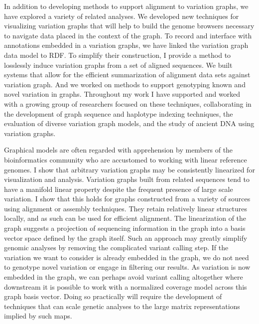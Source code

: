 In addition to developing methods to support alignment to variation graphs, we have explored a variety of related analyses.
We developed new techniques for visualizing variation graphs that will help to build the genome browsers necessary to navigate data placed in the context of the graph.
To record and interface with annotations embedded in a variation graphs, we have linked the variation graph data model to RDF.
To simplify their construction, I provide a method to losslessly induce variation graphs from a set of aligned sequences.
We built systems that allow for the efficient summarization of alignment data sets against variation graph.
And we worked on methods to support genotyping known and novel variation in graphs.
Throughout my work I have supported and worked with a growing group of researchers focused on these techniques, collaborating in the development of graph sequence and haplotype indexing techniques, the evaluation of diverse variation graph models, and the study of ancient DNA using variation graphs.

Graphical models are often regarded with apprehension by members of the bioinformatics community who are accustomed to working with linear reference genomes.
I show that arbitrary variation graphs may be consistently linearized for visualization and analysis.
Variation graphs built from related sequences tend to have a manifold linear property despite the frequent presence of large scale variation.
I show that this holds for graphs constructed from a variety of sources using alignment or assembly techniques.
They retain relatively linear structures locally, and as such can be used for efficient alignment.
The linearization of the graph suggests a projection of sequencing information in the graph into a basis vector space defined by the graph itself.
Such an approach may greatly simplify genomic analyses by removing the complicated variant calling step.
If the variation we want to consider is already embedded in the graph, we do not need to genotype novel variation or engage in filtering our results.
As variation is now embedded in the graph, we can perhaps avoid variant calling altogether where downstream it is possible to work with a normalized coverage model across this graph basis vector.
Doing so practically will require the development of techniques that can scale genetic analyses to the large matrix representations implied by such maps.

